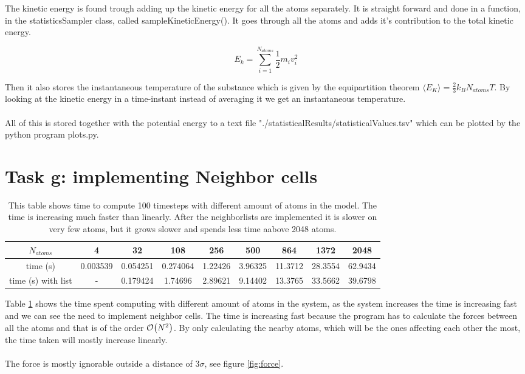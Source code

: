 \documentclass[11pt]{article}
\begin{document}
		The kinetic energy is found trough adding up the kinetic energy for all the atoms separately. It is straight forward and done in a function, in the statisticsSampler class, called sampleKineticEnergy(). It goes through all the atoms and adds it's contribution to the total kinetic energy. 

		\[
		E_k = \sum\limits^{N_{atoms}}_{i=1}{\frac{1}{2}m_i v_i^2}
		\]

		\noindent Then it also stores the instantaneous temperature of the substance which is given by the equipartition theorem \( \langle E_K \rangle = \frac{2}{3} k_B N_{atoms} T \). By looking at the kinetic energy in a time-instant instead of averaging it we get an instantaneous temperature.
\\ \\
		\noindent All of this is stored together with the potential energy to a text file "./statisticalResults/statisticalValues.tsv" which can be plotted by the python program plots.py.

\section{Task g: implementing Neighbor cells}
	\begin{table}
		\begin{tabular}{| c | c | c | c | c | c | c | c | c |}
		\hline
			\(N_{atoms}\)	&	4 			&	32			&	108			&	256		&	500		&	864		& 1372		&	2048
			\\ \hline
			time (s)		&	0.003539	&	0.054251	&	0.274064	&	1.22426	&	3.96325	&	11.3712	& 28.3554	& 62.9434 
			\\ \hline
			time (s) with list & -			& 0.179424		&	1.74696		&	2.89621	&	9.14402	&	13.3765	& 33.5662	& 39.6798
			\\ \hline
		\end{tabular}
		\caption{This table shows time to compute 100 timesteps with different amount of atoms in the model. The time is increasing much faster than linearly. After the neighborlists are implemented it is slower on very few atoms, but it grows slower and spends less time aabove 2048 atoms.}
	\label{tab:time_spent}
	\end{table}

	Table \ref{tab:time_spent} shows the time spent computing with different amount of atoms in the system, as the system increases the time is increasing fast and we can see the need to implement neighbor cells. The time is increasing fast because the program has to calculate the forces between all the atoms and that is of the order \(\order{N^2}\). By only calculating the nearby atoms, which will be the ones affecting each other the most, the time taken will mostly increase linearly.
\\ \\
	\noindent The force is mostly ignorable outside a distance of \(3 \sigma \), see figure \ref{fig:force}.
\end{document}
